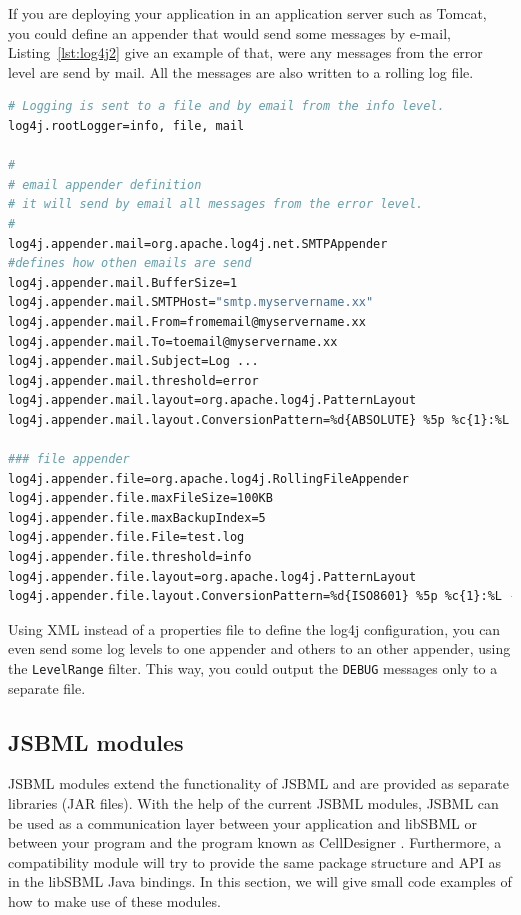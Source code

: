 If you are deploying your application in an application server such as Tomcat,
you could define an appender that would send some messages by e-mail,
Listing~\vref{lst:log4j2} give an example of that, were any messages from the
error level
%
are send by mail. All the messages are also written to a rolling log
file.
\begin{lstlisting}[language=bash,%numbers=none,
caption={SMTPAppender log4j example.}, label=lst:log4j2]
# Logging is sent to a file and by email from the info level.
log4j.rootLogger=info, file, mail

#
# email appender definition
# it will send by email all messages from the error level.
#
log4j.appender.mail=org.apache.log4j.net.SMTPAppender
#defines how othen emails are send
log4j.appender.mail.BufferSize=1
log4j.appender.mail.SMTPHost="smtp.myservername.xx"
log4j.appender.mail.From=fromemail@myservername.xx
log4j.appender.mail.To=toemail@myservername.xx
log4j.appender.mail.Subject=Log ...
log4j.appender.mail.threshold=error
log4j.appender.mail.layout=org.apache.log4j.PatternLayout
log4j.appender.mail.layout.ConversionPattern=%d{ABSOLUTE} %5p %c{1}:%L - %m%n

### file appender
log4j.appender.file=org.apache.log4j.RollingFileAppender
log4j.appender.file.maxFileSize=100KB
log4j.appender.file.maxBackupIndex=5
log4j.appender.file.File=test.log
log4j.appender.file.threshold=info
log4j.appender.file.layout=org.apache.log4j.PatternLayout
log4j.appender.file.layout.ConversionPattern=%d{ISO8601} %5p %c{1}:%L - %m%n
\end{lstlisting}

Using XML instead of a properties file to define the log4j configuration, you
can even send some log levels
%
to one appender and others to an other appender,
using the \texttt{LevelRange} filter. This way, you could output the
\texttt{DEBUG} messages only to a separate file.


\subsection{JSBML modules}

JSBML modules extend the functionality of JSBML and are provided as separate
libraries (JAR files). With the help of the current JSBML modules, JSBML can be
used as a communication layer  between your
application and libSBML \citep{Bornstein2008} or between your program and the
program known as CellDesigner \citep{Funahashi2003}. Furthermore, a
compatibility module
%
will try to provide the same package structure and API as in the libSBML Java
bindings. In this section, we will give small code examples of how to make use
of these modules.

